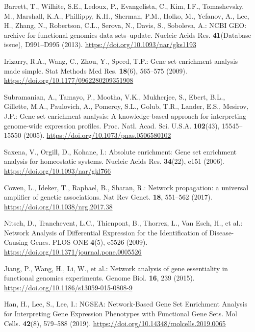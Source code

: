 \documentclass{article}
\begin{document}
\begin{thebibliography}{spmpsci}

Barrett, T., Wilhite, S.E., Ledoux, P., Evangelista, C., Kim, I.F., Tomashevsky, M., Marshall, K.A., Phillippy, K.H., Sherman, P.M., Holko, M., Yefanov, A., Lee, H., Zhang, N., Robertson, C.L., Serova, N., Davis, S., Soboleva, A.:
NCBI GEO: archive for functional genomics data sets--update.
Nucleic Acids Res. \textbf{41}(Database issue), D991--D995 (2013).
\url{https://doi.org/10.1093/nar/gks1193}

Irizarry, R.A., Wang, C., Zhou, Y., Speed, T.P.:
Gene set enrichment analysis made simple.
Stat Methods Med Res. \textbf{18}(6), 565--575 (2009).
\url{https://doi.org/10.1177/0962280209351908}

Subramanian, A., Tamayo, P., Mootha, V.K., Mukherjee, S., Ebert, B.L., Gillette, M.A., Paulovich, A., Pomeroy, S.L., Golub, T.R., Lander, E.S., Mesirov, J.P.:
Gene set enrichment analysis: A knowledge-based approach for interpreting genome-wide expression profiles.
Proc. Natl. Acad. Sci. U.S.A. \textbf{102}(43), 15545--15550 (2005).
\url{https://doi.org/10.1073/pnas.0506580102}

Saxena, V., Orgill, D., Kohane, I.:
Absolute enrichment: Gene set enrichment analysis for homeostatic systems.
Nucleic Acids Res. \textbf{34}(22), e151 (2006).
\url{https://doi.org/10.1093/nar/gkl766}

Cowen, L., Ideker, T., Raphael, B., Sharan, R.:
Network propagation: a universal amplifier of genetic associations.
Nat Rev Genet. \textbf{18}, 551--562 (2017).
\url{https://doi.org/10.1038/nrg.2017.38}

Nitsch, D., Tranchevent, L.C., Thienpont, B., Thorrez, L., Van Esch, H., et al.:
Network Analysis of Differential Expression for the Identification of Disease-Causing Genes.
PLOS ONE \textbf{4}(5), e5526 (2009).
\url{https://doi.org/10.1371/journal.pone.0005526}

Jiang, P., Wang, H., Li, W., et al.:
Network analysis of gene essentiality in functional genomics experiments.
Genome Biol. \textbf{16}, 239 (2015).
\url{https://doi.org/10.1186/s13059-015-0808-9}

Han, H., Lee, S., Lee, I.:
NGSEA: Network-Based Gene Set Enrichment Analysis for Interpreting Gene Expression Phenotypes with Functional Gene Sets.
Mol Cells. \textbf{42}(8), 579--588 (2019).
\url{https://doi.org/10.14348/molcells.2019.0065}


\end{thebibliography}
\end{document}
